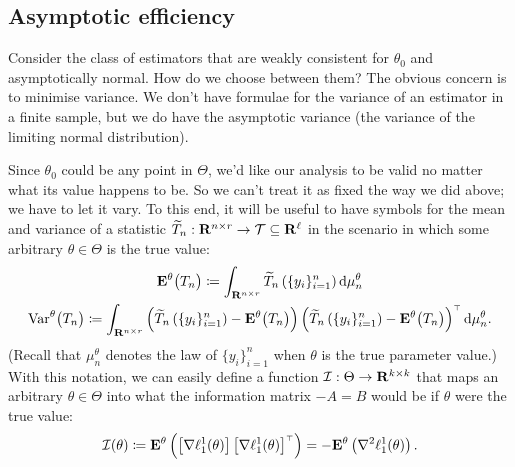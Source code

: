 \documentclass[11pt,letterpaper,reqno,oneside]{article}
\begin{document}
\subsection{Asymptotic efficiency}
\label{sec:MLE:efficiency}

Consider the class of estimators that are weakly consistent for $\theta_0$ and asymptotically normal. How do we choose between them? The obvious concern is to minimise variance. We don't have formulae for the variance of an estimator in a finite sample, but we do have the asymptotic variance (the variance of the limiting normal distribution).

Since $\theta_0$ could be any point in $\Theta$, we'd like our analysis to be valid no matter what its value happens to be. So we can't treat it as fixed the way we did above; we have to let it vary. To this end, it will be useful to have symbols for the mean and variance of a statistic $\widetilde{T}_n : \mathbf{R}^{n\times r} \to \mathcal{T}\subseteq\mathbf{R}^\ell$ in the scenario in which some arbitrary $\theta \in \Theta$ is the true value:
%
\begin{gather*}
	\mathbf{E}^\theta\bigl( T_n \bigr)
	\coloneqq \int_{\mathbf{R}^{n\times r}} 
	\widetilde{T}_n\left( \{ y_i \}_{i=1}^n \right)
	\mathrm{d}\mu_n^\theta
	\\
	\mathrm{Var}^\theta\bigl( T_n \bigr)
	\coloneqq \int_{\mathbf{R}^{n\times r}} 
	\left( \widetilde{T}_n\left( \{ y_i \}_{i=1}^n \right) 
	- \mathbf{E}^\theta\bigl( T_n \bigr) \right)
	\left( \widetilde{T}_n\left( \{ y_i \}_{i=1}^n \right) 
	- \mathbf{E}^\theta\bigl( T_n \bigr) \right)^{\scriptscriptstyle \top}
	\mathrm{d}\mu_n^\theta .
\end{gather*}
%
(Recall that $\mu_n^\theta$ denotes the law of $\{ y_i \}_{i=1}^n$ when $\theta$ is the true parameter value.) With this notation, we can easily define a function $\mathcal{I} : \Theta \to \mathbf{R}^{k \times k}$ that maps an arbitrary $\theta \in \Theta$ into what the information matrix $-A=B$ would be if $\theta$ were the true value:
%
\begin{equation*}
	\mathcal{I}(\theta) 
	\coloneqq \mathbf{E}^\theta \left( 
	\left[ \nabla \ell^1_1(\theta) \right] 
	\left[ \nabla \ell^1_1(\theta) \right]^{\scriptscriptstyle \top} \right) 
	= - \mathbf{E}^\theta \left( 
	\nabla^2 \ell^1_1(\theta) \right)  .
\end{equation*}
\end{document}
